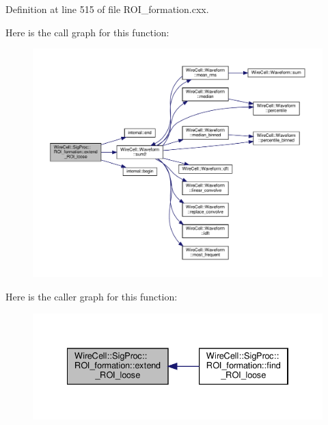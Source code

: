 Definition at line 515 of file R\+O\+I\+\_\+formation.\+cxx.

Here is the call graph for this function\+:
\nopagebreak
\begin{figure}[H]
\begin{center}
\leavevmode
\includegraphics[width=350pt]{class_wire_cell_1_1_sig_proc_1_1_r_o_i__formation_aadada4e6a77ac41217a7b8858b26355f_cgraph}
\end{center}
\end{figure}
Here is the caller graph for this function\+:
\nopagebreak
\begin{figure}[H]
\begin{center}
\leavevmode
\includegraphics[width=334pt]{class_wire_cell_1_1_sig_proc_1_1_r_o_i__formation_aadada4e6a77ac41217a7b8858b26355f_icgraph}
\end{center}
\end{figure}
\mbox{\label{class_wire_cell_1_1_sig_proc_1_1_r_o_i__formation_a3d677e7421cc9da9a878d9e5528c9b2a}} 
